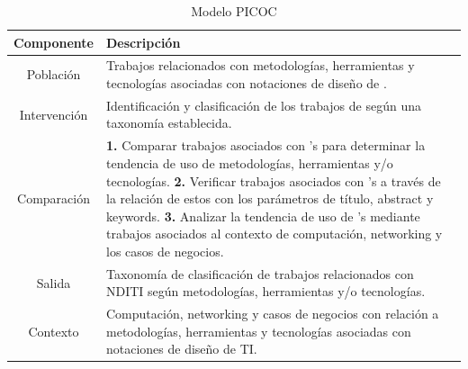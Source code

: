 \begin{table}[H]
	\centering
	\renewcommand{\arraystretch}{1.5} %
	\fontsize{9pt}{10pt}\selectfont %
	\begin{tabular}{|c|p{12cm}|} %
		\hline
		\textbf{Componente} & \textbf{Descripción}                                                                                                                                                                                                                                                                                                                                                                                                                                                                             \\ \hline

		Población           & Trabajos relacionados con metodologías, herramientas y tecnologías asociadas con notaciones de diseño de \TI.                                                  \\ \hline

		Intervención        & Identificación y clasificación de los trabajos de \NDITI según una taxonomía establecida. \\ \hline

		Comparación         &
		\textbf{1.} Comparar trabajos asociados con \NDITI's para determinar la tendencia de uso de metodologías, herramientas y/o  tecnologías.
		\textbf{2.} Verificar trabajos asociados con \NDITI's a través de la relación de estos con los parámetros de título, abstract y keywords.
		\textbf{3.} Analizar la tendencia de uso de \NDITI's mediante trabajos asociados al contexto de computación, networking y los casos de negocios.                                                                                                                                                                                                                                                                                                                                                                                                                                                                 \\ \hline
		Salida              & Taxonomía de clasificación de trabajos relacionados con NDITI según metodologías, herramientas y/o tecnologías.                       \\ \hline
		Contexto            & Computación, networking y casos de negocios con relación a metodologías, herramientas y tecnologías asociadas con notaciones de diseño de TI.                                                                                                                     \\ \hline
	\end{tabular}
	\caption{Modelo PICOC}
	\label{table:modelo-picoc}
\end{table}




